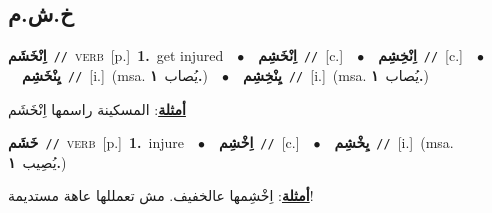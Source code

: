 \documentclass[10pt,a4paper,twoside]{article} %
\begin{document}
\begin{multicols}{2}
\vspace{-3mm}
\subsection*{\color{blue}\foreignlanguage{arabic}{خ.ش.م}\color{blue}{}} 

{\setlength\topsep{0pt}\textbf{\foreignlanguage{arabic}{اِنْخَشَم}}\ {\color{gray}\texttt{//}\color{black}}\ \textsc{verb}\ [p.]\ \textbf{1.}~get injured\ \ $\bullet$\ \ \setlength\topsep{0pt}\textbf{\foreignlanguage{arabic}{اِنْخَشِم}}\ {\color{gray}\texttt{//}\color{black}}\ [c.]\ \ $\bullet$\ \ \setlength\topsep{0pt}\textbf{\foreignlanguage{arabic}{اِنْخِشِم}}\ {\color{gray}\texttt{//}\color{black}}\ [c.]\ \ $\bullet$\ \ \setlength\topsep{0pt}\textbf{\foreignlanguage{arabic}{يِنْخَشِم}}\ {\color{gray}\texttt{//}\color{black}}\ [i.]\ \color{gray}(msa. \foreignlanguage{arabic}{يُصاب}~\foreignlanguage{arabic}{\textbf{١.}})\color{black}\ \ $\bullet$\ \ \setlength\topsep{0pt}\textbf{\foreignlanguage{arabic}{يِنْخِشِم}}\ {\color{gray}\texttt{//}\color{black}}\ [i.]\ \color{gray}(msa. \foreignlanguage{arabic}{يُصاب}~\foreignlanguage{arabic}{\textbf{١.}})\color{black}\  \begin{flushright}\color{gray}\foreignlanguage{arabic}{\textbf{\underline{\foreignlanguage{arabic}{أمثلة}}}: المسكينة راسمها اِنْخَشَم}\end{flushright}\color{black}} \vspace{2mm}

{\setlength\topsep{0pt}\textbf{\foreignlanguage{arabic}{خَشَم}}\ {\color{gray}\texttt{//}\color{black}}\ \textsc{verb}\ [p.]\ \textbf{1.}~injure\ \ $\bullet$\ \ \setlength\topsep{0pt}\textbf{\foreignlanguage{arabic}{اِخْشِم}}\ {\color{gray}\texttt{//}\color{black}}\ [c.]\ \ $\bullet$\ \ \setlength\topsep{0pt}\textbf{\foreignlanguage{arabic}{يِخْشِم}}\ {\color{gray}\texttt{//}\color{black}}\ [i.]\ \color{gray}(msa. \foreignlanguage{arabic}{يُصِيب}~\foreignlanguage{arabic}{\textbf{١.}})\color{black}\  \begin{flushright}\color{gray}\foreignlanguage{arabic}{\textbf{\underline{\foreignlanguage{arabic}{أمثلة}}}: اِخْشِمها عالخفيف. مش تعمللها عاهة مستديمة!}\end{flushright}\color{black}} \vspace{2mm}


\end{multicols}
\end{document}
